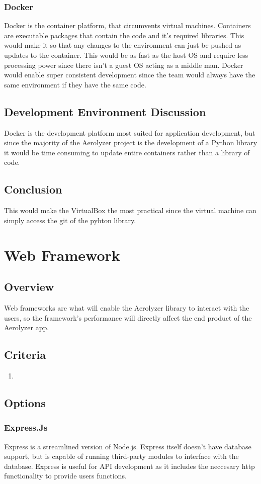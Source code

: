 \documentclass[onecolumn, draftclsnofoot,10pt, compsoc]{IEEEtran}
\begin{document}
\begin{singlespace}
\subsubsection{Docker}
Docker is the container platform, that circumvents virtual machines. Containers are executable packages that contain the code and it's required libraries.
This would make it so that any changes to the environment can just be pushed as updates to the container.
This would be as fast as the host OS and require less processing power since there isn't a guest OS acting as a middle man.
Docker would enable super consistent development since the team would always have the same environment if they have the same code.
\subsection{Development Environment Discussion}
Docker is the development platform most suited for application development, but since the majority of the Aerolyzer project is the development of a Python library it would be time consuming to update entire containers rather than a library of code.
\subsection{Conclusion}
This would make the VirtualBox the most practical since the virtual machine can simply access the git of the pyhton library.

\section{Web Framework}
\subsection{Overview}
Web frameworks are what will enable the Aerolyzer library to interact with the users, so the framework's performance will directly affect the end product of the Aerolyzer app.
\subsection{Criteria}
\begin{enumerate}
\item
\end{enumerate}
\subsection{Options}
\subsubsection{Express.Js}
Express is a streamlined version of Node.js.
Express itself doesn't have database support, but is capable of running third-party modules to interface with the database.
Express is useful for API development as it includes the neccesary http functionality to provide users functions.

\end{singlespace}
\end{document}
